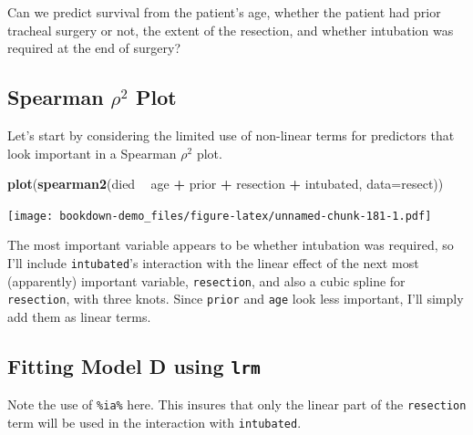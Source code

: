 \documentclass[]{book}
\newenvironment{Shaded}{\begin{snugshade}}{\end{snugshade}}
\newcommand{\KeywordTok}[1]{\textcolor[rgb]{0.13,0.29,0.53}{\textbf{#1}}}
\newcommand{\DataTypeTok}[1]{\textcolor[rgb]{0.13,0.29,0.53}{#1}}
\newcommand{\StringTok}[1]{\textcolor[rgb]{0.31,0.60,0.02}{#1}}
\newcommand{\OperatorTok}[1]{\textcolor[rgb]{0.81,0.36,0.00}{\textbf{#1}}}
\newcommand{\NormalTok}[1]{#1}
\theoremstyle{definition}
\theoremstyle{definition}
\theoremstyle{definition}
\theoremstyle{remark}
\begin{document}
Can we predict survival from the patient's age, whether the patient had
prior tracheal surgery or not, the extent of the resection, and whether
intubation was required at the end of surgery?

\subsection{\texorpdfstring{Spearman \(\rho^2\)
Plot}{Spearman \textbackslash{}rho\^{}2 Plot}}\label{spearman-rho2-plot}

Let's start by considering the limited use of non-linear terms for
predictors that look important in a Spearman \(\rho^2\) plot.

\begin{Shaded}
\begin{Highlighting}[]
\KeywordTok{plot}\NormalTok{(}\KeywordTok{spearman2}\NormalTok{(died }\OperatorTok{~}\StringTok{ }\NormalTok{age }\OperatorTok{+}\StringTok{ }\NormalTok{prior }\OperatorTok{+}\StringTok{ }\NormalTok{resection }\OperatorTok{+}\StringTok{ }\NormalTok{intubated, }\DataTypeTok{data=}\NormalTok{resect))}
\end{Highlighting}
\end{Shaded}

\texttt{[image: bookdown-demo\_files/figure-latex/unnamed-chunk-181-1.pdf]}

The most important variable appears to be whether intubation was
required, so I'll include \texttt{intubated}'s interaction with the
linear effect of the next most (apparently) important variable,
\texttt{resection}, and also a cubic spline for \texttt{resection}, with
three knots. Since \texttt{prior} and \texttt{age} look less important,
I'll simply add them as linear terms.

\subsection{\texorpdfstring{Fitting Model D using
\texttt{lrm}}{Fitting Model D using lrm}}\label{fitting-model-d-using-lrm}

Note the use of \texttt{\%ia\%} here. This insures that only the linear
part of the \texttt{resection} term will be used in the interaction with
\texttt{intubated}.
\end{document}
